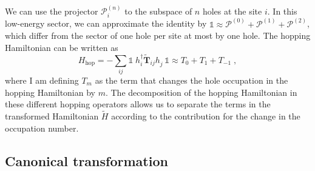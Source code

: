 We can use the projector $\mathcal{P}^{(n)}_{i}$ to the subspace of $n$ holes at the site $i$. In this low-energy sector, we can approximate the identity by $\mathbb{1} \approx \mathcal{P}^{(0)}_{ }+\mathcal{P}^{(1)}_{ }+\mathcal{P}^{(2)}_{ }$, which differ from the sector of one hole per site at most by one hole. The hopping Hamiltonian can be written as
\begin{equation}
    H_{\text{hop}} = - \sum_{ij} \mathbb{1} \;  h_i^\dagger  \tilde{\mathbf{T}}_{ij} h_j^{\phantom{\dagger}}  \, \mathbb{1} \approx T_0 + T_1 + T_{-1}\; ,
\end{equation}
where I am defining $T_m$ as the term that changes the hole occupation in the hopping Hamiltonian by $m$.
The decomposition of the hopping Hamiltonian in these different hopping operators allows us to separate the terms in the transformed Hamiltonian $\tilde{H}$ according to the contribution for the change in the occupation number.

\subsection{Canonical transformation}\label{sec:II-1-canon}

